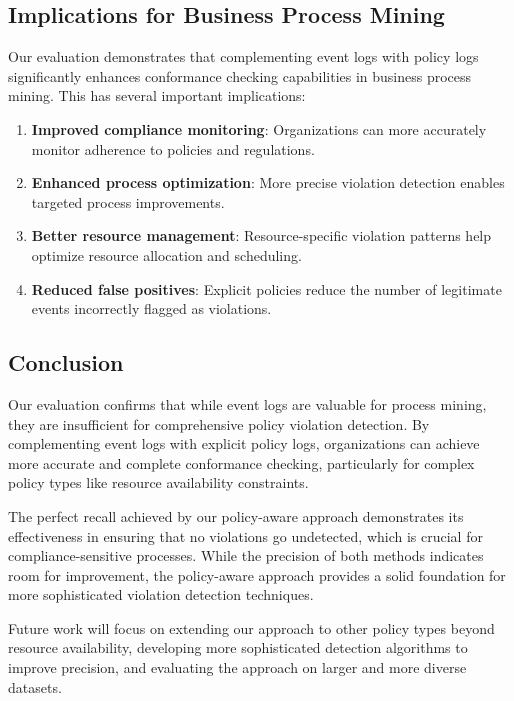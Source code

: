 \subsection{Implications for Business Process Mining}

Our evaluation demonstrates that complementing event logs with policy logs significantly enhances conformance checking capabilities in business process mining. This has several important implications:

\begin{enumerate}
    \item \textbf{Improved compliance monitoring}: Organizations can more accurately monitor adherence to policies and regulations.
    
    \item \textbf{Enhanced process optimization}: More precise violation detection enables targeted process improvements.
    
    \item \textbf{Better resource management}: Resource-specific violation patterns help optimize resource allocation and scheduling.
    
    \item \textbf{Reduced false positives}: Explicit policies reduce the number of legitimate events incorrectly flagged as violations.
\end{enumerate}

\subsection{Conclusion}

Our evaluation confirms that while event logs are valuable for process mining, they are insufficient for comprehensive policy violation detection. By complementing event logs with explicit policy logs, organizations can achieve more accurate and complete conformance checking, particularly for complex policy types like resource availability constraints.

The perfect recall achieved by our policy-aware approach demonstrates its effectiveness in ensuring that no violations go undetected, which is crucial for compliance-sensitive processes. While the precision of both methods indicates room for improvement, the policy-aware approach provides a solid foundation for more sophisticated violation detection techniques.

Future work will focus on extending our approach to other policy types beyond resource availability, developing more sophisticated detection algorithms to improve precision, and evaluating the approach on larger and more diverse datasets.
